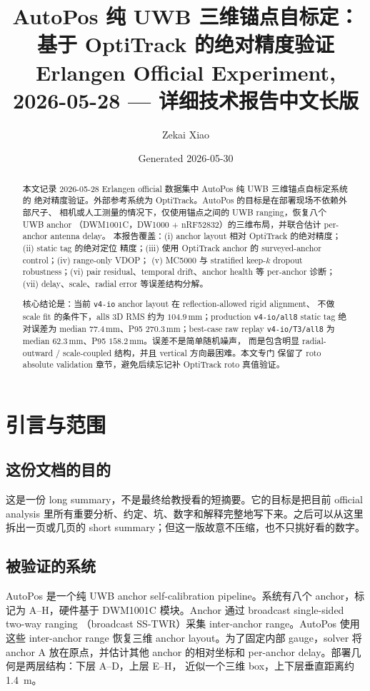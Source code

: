 \documentclass[11pt,a4paper]{article}
\title{\textbf{AutoPos 纯 UWB 三维锚点自标定：\\
基于 OptiTrack 的绝对精度验证\\[4pt]
\large Erlangen Official Experiment, 2026-05-28 --- 详细技术报告中文长版}}
\author{Zekai Xiao}
\date{Generated 2026-05-30}
\newcommand{\mm}{\,\si{\milli\meter}}
\begin{document}
\maketitle
\thispagestyle{fancy}

\begin{abstract}
\noindent
本文记录 2026-05-28 Erlangen official 数据集中 AutoPos 纯 UWB 三维锚点自标定系统的
绝对精度验证。外部参考系统为 OptiTrack。AutoPos 的目标是在部署现场不依赖外部尺子、
相机或人工测量的情况下，仅使用锚点之间的 UWB ranging，恢复八个 UWB anchor
（DWM1001C，DW1000 + nRF52832）的三维布局，并联合估计 per-anchor antenna delay。
本报告覆盖：(i) anchor layout 相对 OptiTrack 的绝对精度；(ii) static tag 的绝对定位
精度；(iii) 使用 OptiTrack anchor 的 surveyed-anchor control；(iv) range-only VDOP；
(v) MC5000 与 stratified keep-$k$ dropout robustness；(vi) pair residual、temporal
drift、anchor health 等 per-anchor 诊断；(vii) delay、scale、radial error 等误差结构分解。

核心结论是：当前 \texttt{v4-io} anchor layout 在 reflection-allowed rigid alignment、
不做 scale fit 的条件下，all8 3D RMS 约为 $104.9\mm$；production \texttt{v4-io/all8}
static tag 绝对误差为 median $77.4\mm$、P95 $270.3\mm$；best-case raw replay
\texttt{v4-io/T3/all8} 为 median $62.3\mm$、P95 $158.2\mm$。误差不是简单随机噪声，
而是包含明显 radial-outward / scale-coupled 结构，并且 vertical 方向最困难。本文专门
保留了 roto absolute validation 章节，避免后续忘记补 OptiTrack roto 真值验证。
\end{abstract}

\tableofcontents
\clearpage

\section{引言与范围}

\subsection{这份文档的目的}
这是一份 long summary，不是最终给教授看的短摘要。它的目标是把目前 official analysis
里所有重要分析、约定、坑、数字和解释完整地写下来。之后可以从这里拆出一页或几页的
short summary；但这一版故意不压缩，也不只挑好看的数字。

\subsection{被验证的系统}
AutoPos 是一个纯 UWB anchor self-calibration pipeline。系统有八个 anchor，标记为
A--H，硬件基于 DWM1001C 模块。Anchor 通过 broadcast single-sided two-way ranging
（broadcast SS-TWR）采集 inter-anchor range。AutoPos 使用这些 inter-anchor range
恢复三维 anchor layout。为了固定内部 gauge，solver 将 anchor A 放在原点，并估计其他
anchor 的相对坐标和 per-anchor delay。部署几何是两层结构：下层 A--D，上层 E--H，
近似一个三维 box，上下层垂直距离约 \SI{1.4}{\meter}。
\end{document}
